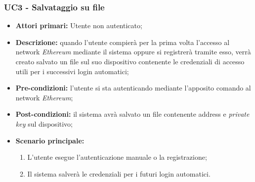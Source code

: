\subsubsection{UC3 - Salvataggio su file}
\begin{itemize}
	\item \textbf{Attori primari:} Utente non autenticato;
	\item \textbf{Descrizione:} quando l'utente compierà per la prima volta l'accesso al network \textit{Ethereum\glo} mediante il sistema oppure si registrerà tramite esso, verrà creato salvato un file sul suo dispositivo contenente le credenziali di accesso utili per i successivi login automatici; 
	\item \textbf{Pre-condizioni:} l'utente si sta autenticando mediante l'apposito comando al network \textit{Ethereum\glos};
	\item \textbf{Post-condizioni:} il sistema avrà salvato un file contenente address e \textit{private key\glo} sul dispositivo;
	\item \textbf{Scenario principale:} 
	\begin{enumerate}
		\item L'utente esegue l'autenticazione manuale o la registrazione;
		\item Il sistema salverà le credenziali per i futuri login automatici.
	\end{enumerate}
\end{itemize}